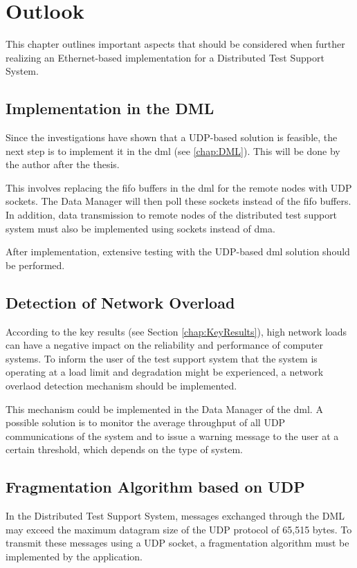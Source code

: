\chapter{Outlook} \label{chap:Outlook}
This chapter outlines important aspects that should be considered when further realizing an Ethernet-based implementation for a Distributed Test Support System.

\section{Implementation in the DML}
Since the investigations have shown that a UDP-based solution is feasible, the next step is to implement it in the \acf{dml} (see \ref{chap:DML}). This will be done by the author after the thesis.

This involves replacing the \ac{fifo} buffers in the \ac{dml} for the remote nodes with UDP sockets. The Data Manager will then poll these sockets instead of the \ac{fifo} buffers. In addition, data transmission to remote nodes of the distributed test support system must also be implemented using sockets instead of \ac{dma}.

After implementation, extensive testing with the UDP-based \ac{dml} solution should be performed.

\section{Detection of Network Overload}
According to the key results (see Section \ref{chap:KeyResults}), high network loads can have a negative impact on the reliability and performance of computer systems. To inform the user of the test support system that the system is operating at a load limit and degradation might be experienced, a network overlaod detection mechanism should be implemented.

This mechanism could be implemented in the Data Manager of the \ac{dml}. A possible solution is to monitor the average throughput of all UDP communications of the system and to issue a warning message to the user at a certain threshold, which depends on the type of system.

\section{Fragmentation Algorithm based on UDP} \label{chap:fragProposalOutlook}
In the Distributed Test Support System, messages exchanged through the DML may exceed the maximum datagram size of the UDP protocol of 65,515 bytes. To transmit these messages using a UDP socket, a fragmentation algorithm must be implemented by the application.

